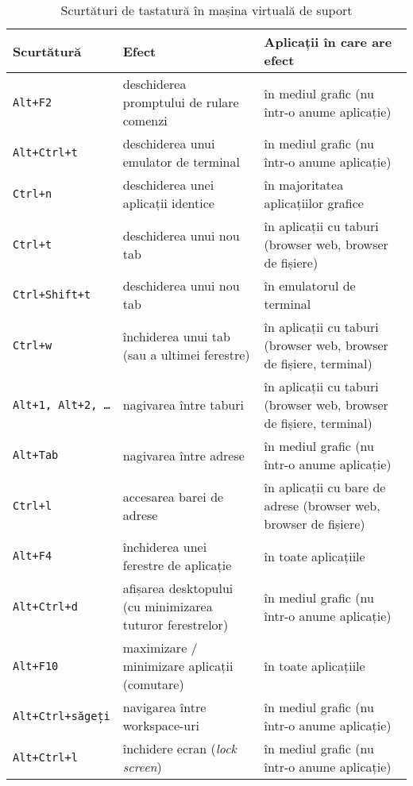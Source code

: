 \begin{table}[!htb]
  \scriptsize
  \begin{center}
    \begin{tabular}{ p{} p{} p{} }
      \toprule
        \textbf{Scurtătură} &
        \textbf{Efect} &
        \textbf{Aplicații în care are efect} \\
      \midrule
        \texttt{Alt+F2} &
        deschiderea promptului de rulare comenzi &
        în mediul grafic (nu într-o anume aplicație) \\
      \midrule
        \texttt{Alt+Ctrl+t} &
        deschiderea unui emulator de terminal &
        în mediul grafic (nu într-o anume aplicație) \\
      \midrule
        \texttt{Ctrl+n} &
        deschiderea unei aplicații identice &
        în majoritatea aplicațiilor grafice \\
      \midrule
        \texttt{Ctrl+t} &
        deschiderea unui nou tab &
        în aplicații cu taburi (browser web, browser de fișiere) \\
      \midrule
        \texttt{Ctrl+Shift+t} &
        deschiderea unui nou tab &
        în emulatorul de terminal \\
      \midrule
        \texttt{Ctrl+w} &
        închiderea unui tab (sau a ultimei ferestre) &
        în aplicații cu taburi (browser web, browser de fișiere, terminal) \\
      \midrule
        \texttt{Alt+1, Alt+2, \ldots} &
        nagivarea între taburi &
        în aplicații cu taburi (browser web, browser de fișiere, terminal) \\
      \midrule
        \texttt{Alt+Tab} &
        nagivarea între adrese &
        în mediul grafic (nu într-o anume aplicație) \\
      \midrule
        \texttt{Ctrl+l} &
        accesarea barei de adrese &
        în aplicații cu bare de adrese (browser web, browser de fișiere) \\
      \midrule
        \texttt{Alt+F4} &
        închiderea unei ferestre de aplicație &
        în toate aplicațiile \\
      \midrule
        \texttt{Alt+Ctrl+d} &
        afișarea desktopului (cu minimizarea tuturor ferestrelor) &
        în mediul grafic (nu într-o anume aplicație) \\
      \midrule
        \texttt{Alt+F10} &
        maximizare / minimizare aplicații (comutare) &
        în toate aplicațiile \\
      \midrule
        \texttt{Alt+Ctrl+săgeți} &
        navigarea între workspace-uri &
        în mediul grafic (nu într-o anume aplicație) \\
      \midrule
        \texttt{Alt+Ctrl+l} &
        închidere ecran (\textit{lock screen}) &
        în mediul grafic (nu într-o anume aplicație) \\
      \bottomrule
    \end{tabular}
  \end{center}
  \caption{Scurtături de tastatură în mașina virtuală de suport}
  \label{tab:ui:vm-shortcuts}
\end{table}


